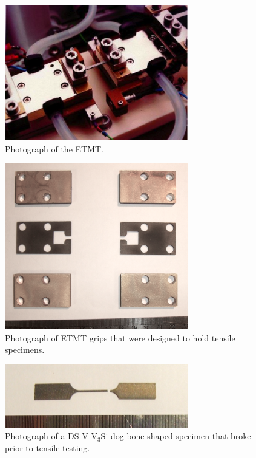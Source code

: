 %
\begin{figure}[H]
\begin{center}
\includegraphics[width=8cm]{etmt}
\caption{Photograph of the ETMT.}
\label{fig:ETMTphoto}
\end{center}
\end{figure}
%
%
\begin{figure}[H]
\begin{center}
\includegraphics[width=8cm]{etmtgrips}
\caption{Photograph of ETMT grips that were designed to hold tensile specimens.}
\label{fig:etmtgrips}
\end{center}
\end{figure}
%

%
\begin{figure}[H]
\begin{center}
\includegraphics[width=8cm]{vdogbone}
\caption{Photograph of a DS V-V$_3$Si dog-bone-shaped specimen that broke prior to tensile testing.}
\label{fig:vdogbone}
\end{center}
\end{figure}
%

